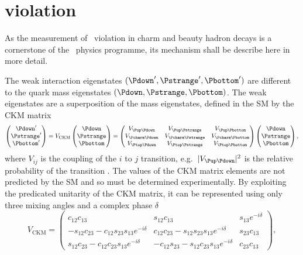 \section{\texorpdfstring{\CP}{CP} violation}
\label{chap:intro:sm:cp}

As the measurement of \CP\ violation in charm and beauty hadron decays is a 
cornerstone of the \lhcb\ physics programme, its mechanism shall be describe 
here in more detail.

The weak interaction eigenstates $(\Pdown', \Pstrange', \Pbottom')$ 
are different to the quark mass eigenstates $(\Pdown, \Pstrange, \Pbottom)$.
The weak eigenstates are a superposition of the mass eigenstates, defined in 
the SM by the \ac{CKM} matrix
\begin{equation}
  \begin{pmatrix} \Pdown' \\ \Pstrange' \\ \Pbottom' \end{pmatrix}
  =
  V_{\text{CKM}}\begin{pmatrix} \Pdown \\ \Pstrange \\ \Pbottom \end{pmatrix}
  =
  \begin{pmatrix}
    \Vud & \Vus & \Vub \\
    \Vcd & \Vcs & \Vcb \\
    \Vtd & \Vts & \Vtb
  \end{pmatrix}
  \begin{pmatrix} \Pdown \\ \Pstrange \\ \Pbottom \end{pmatrix},
\end{equation}
where $V_{ij}$ is the coupling of the $i$ to $j$ transition, e.g.\ $|\Vud|^{2}$ is 
the relative probability of the transition \decay{\Pdown}{\Pup}.
The values of the \ac{CKM} matrix elements are not predicted by the \ac{SM} and 
so must be determined experimentally.
By exploiting the predicated unitarity of the \ac{CKM} matrix, it can be 
represented using only three mixing angles and a complex phase $\delta$
\begin{equation}
  V_{\textrm{CKM}} =
  \begin{pmatrix}
    c_{12}c_{13} & s_{12}c_{13} & s_{13}e^{-i\delta} \\
    -s_{12}c_{23} - c_{12}s_{23}s_{13}e^{-i\delta} & c_{12}c_{23} - s_{12}s_{23}s_{13}e^{-i\delta} & s_{23}c_{13} \\
    s_{12}c_{23} - c_{12}c_{23}s_{13}e^{-i\delta} & -c_{12}s_{23} - s_{12}c_{23}s_{13}e^{-i\delta} & c_{23}c_{13}
  \end{pmatrix},
\end{equation}

